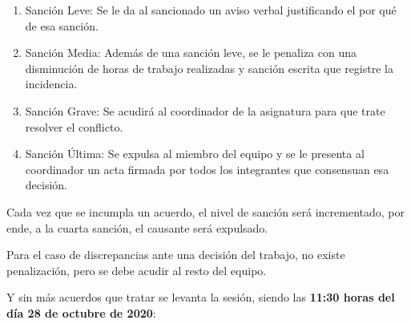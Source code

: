 \documentclass[]{article}
\begin{document}
\begin{enumerate}

	\item{Sanción Leve: Se le da al sancionado un aviso verbal justificando el por qué de esa sanción.}
	\item{Sanción Media: Además de una sanción leve, se le penaliza con una disminución de horas de trabajo realizadas y sanción escrita que registre la incidencia.}
	\item{Sanción Grave: Se acudirá al coordinador de la asignatura para que trate resolver el conflicto.}
	\item{Sanción Última: Se expulsa al miembro del equipo y se le presenta al coordinador un acta firmada por todos los integrantes que consensuan esa decisión.}

\end{enumerate}

Cada vez que se incumpla un acuerdo, el nivel de sanción será incrementado, por ende, a la cuarta sanción, el causante será expulsado.

Para el caso de discrepancias ante una decisión del trabajo, no existe penalización, pero se debe acudir al resto del equipo.

\clearpage

Y sin más acuerdos que tratar se levanta la sesión, siendo las \textbf{11:30 horas del día 28 de octubre de 2020}:
\end{document}
